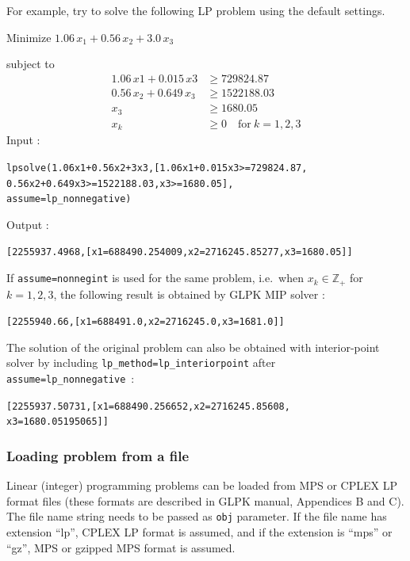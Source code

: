 \documentclass[a4paper,11pt]{book}
\begin{document}
For example, try to solve the following LP problem using the default settings.
\begin{center}
	Minimize $ 1.06\,x_1+0.56\,x_2+3.0\,x_3	$
\end{center}
subject to
\begin{align*}
1.06\,x1+0.015\,x3 &\geq 729824.87\\
0.56\,x_2+0.649\,x_3 &\geq 1522188.03\\
x_3 &\geq 1680.05\\
x_k &\geq 0\quad\text{for}\ k=1,2,3
\end{align*}
\noindent Input :
\begin{center}
	 {\tt lpsolve(1.06x1+0.56x2+3x3,[1.06x1+0.015x3>=729824.87,}\\
	 {\tt 0.56x2+0.649x3>=1522188.03,x3>=1680.05],}\\
	 {\tt assume=lp\_nonnegative)}
\end{center}
Output :
\begin{center}
\tt [2255937.4968,[x1=688490.254009,x2=2716245.85277,x3=1680.05]]
\end{center}
If {\tt assume=nonnegint} is used for the same problem, i.e.~when $ x_k\in\mathbb{Z}_+ $ for $ k=1,2,3 $, the following result is obtained by GLPK MIP solver :
\begin{center}
	\tt [2255940.66,[x1=688491.0,x2=2716245.0,x3=1681.0]]
\end{center}
The solution of the original problem can also be obtained with interior-point solver by including {\tt lp\_method=lp\_interiorpoint} after {\tt assume=lp\_nonnegative}~:
\begin{center}
	\tt [2255937.50731,[x1=688490.256652,x2=2716245.85608,\\
	x3=1680.05195065]]
\end{center}

\subsubsection{Loading problem from a file}
Linear (integer) programming problems can be loaded from MPS or CPLEX LP format files (these formats are described in GLPK manual, Appendices B and C). The file name string needs to be passed as {\tt obj} parameter. If the file name has extension ``lp'', CPLEX LP format is assumed, and if the extension is ``mps'' or ``gz'', MPS or gzipped MPS format is assumed.
\end{document}
